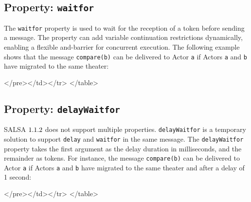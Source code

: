 \subsection{Property: {\tt waitfor}}
The {\tt waitfor} property is used to wait for the reception of a token 
before sending a message. The property can add variable continuation restrictions dynamically, 
enabling a flexible and-barrier for concurrent execution.
The following example shows that the message {\tt compare(b)} can be delivered to Actor {\tt a} if
Actors {\tt a} and {\tt b} have migrated to the same theater:  
{\singlespace

}
\begin{htmlonly}

 \begin{rawhtml} 
   </pre></td></tr>
  </table>
\end{rawhtml} 
\end{htmlonly}

\subsection{Property: {\tt delayWaitfor}}
SALSA $1.1.2$ does not support multiple properties.
{\tt delayWaitfor} is a temporary solution to support
{\tt delay} and {\tt waitfor} in the same message.
The {\tt delayWaitfor} property takes the first argument as the delay duration in milliseconds,
and the remainder as tokens. For instance,
the message {\tt compare(b)} can be delivered to Actor {\tt a} if
Actors {\tt a} and {\tt b} have migrated to the same theater and 
after a delay of 1 second:  

{\singlespace

}
\begin{htmlonly}

 \begin{rawhtml} 
   </pre></td></tr>
  </table>
\end{rawhtml} 
\end{htmlonly}
